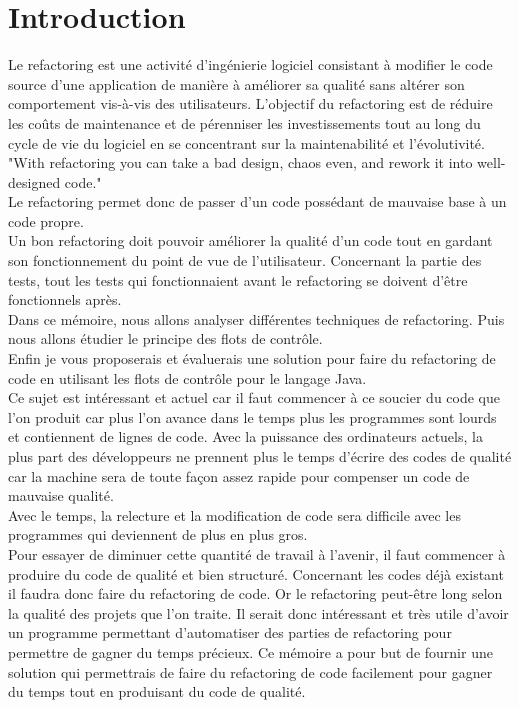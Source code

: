 \documentclass[a4paper,twoside,12pt,openright]{report}
\begin{document}
\section{Introduction}
Le refactoring est une activité d'ingénierie logiciel consistant à modifier le code source d'une application de manière à améliorer sa qualité sans altérer son comportement vis-à-vis des utilisateurs.
L'objectif du refactoring est de réduire les coûts de maintenance et de pérenniser les investissements tout au long du cycle de vie du logiciel en se concentrant sur la maintenabilité et l'évolutivité.\cite{ref1}\\
"With refactoring you can take a bad design, chaos even, and rework it into well-designed code."\cite{ref2}\\
Le refactoring permet donc de passer d'un code possédant de mauvaise base à un code propre.\\
Un bon refactoring doit pouvoir améliorer la qualité d'un code tout en gardant son fonctionnement du point de vue de l'utilisateur. Concernant la partie des tests, tout les tests qui fonctionnaient avant le refactoring se doivent d'être fonctionnels après.\\
Dans ce mémoire, nous allons analyser différentes techniques de refactoring. Puis nous allons étudier le principe des flots de contrôle.\\ Enfin je vous proposerais et évaluerais une solution pour faire du refactoring de code en utilisant les flots de contrôle pour le langage Java.\\
Ce sujet est intéressant et actuel car il faut commencer à ce soucier du code que l'on produit car plus l'on avance dans le temps plus les programmes sont lourds et contiennent de lignes de code. Avec la puissance des ordinateurs actuels, la plus part des développeurs ne prennent plus le temps d'écrire des codes de qualité car la machine sera de toute façon assez rapide pour compenser un code de mauvaise qualité.\cite{ref4}\\
Avec le temps, la relecture et la modification de code sera difficile avec les programmes qui deviennent de plus en plus gros.\cite{ref4}\\
Pour essayer de diminuer cette quantité de travail à l'avenir, il faut commencer à produire du code de qualité et bien structuré. Concernant les codes déjà existant il faudra donc faire du refactoring de code. Or le refactoring peut-être long selon la qualité des projets que l'on traite. Il serait donc intéressant et très utile d'avoir un programme permettant d'automatiser des parties de refactoring pour permettre de gagner du temps précieux. 
Ce mémoire a pour but de fournir une solution qui permettrais de faire du refactoring de code facilement pour gagner du temps tout en produisant du code de qualité.\cite{ref3}
\end{document}
